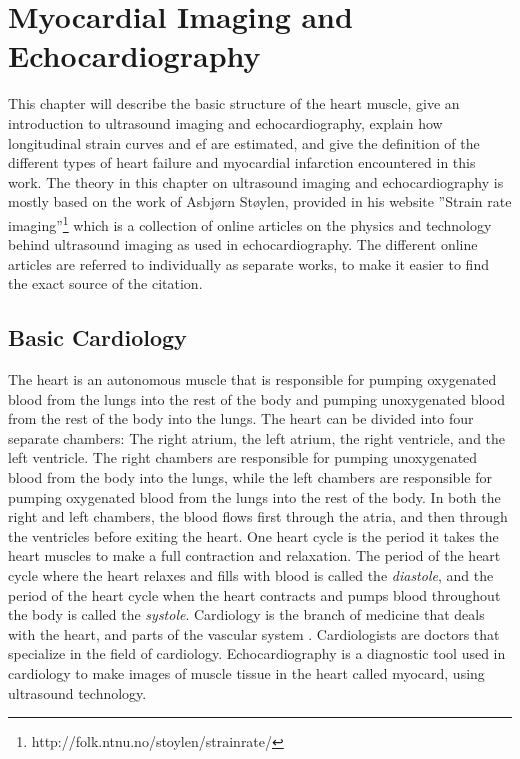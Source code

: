 \chapter{Myocardial Imaging and Echocardiography} \label{chap:strain}

This chapter will describe the basic structure of the heart muscle, give an introduction to ultrasound imaging and echocardiography, explain how longitudinal strain curves and \acrfull{ef} are estimated, and give the definition of the different types of heart failure and myocardial infarction encountered in this work. The theory in this chapter on ultrasound imaging and echocardiography is mostly based on the work of Asbjørn Støylen, provided in his website ''Strain rate imaging''\footnote{http://folk.ntnu.no/stoylen/strainrate/} which is a collection of online articles on the physics and technology behind ultrasound imaging as used in echocardiography. The different online articles are referred to individually as separate works, to make it easier to find the exact source of the citation.

\section{Basic Cardiology}

The heart is an autonomous muscle that is responsible for pumping oxygenated blood from the lungs into the rest of the body and pumping unoxygenated blood from the rest of the body into the lungs. The heart can be divided into four separate chambers: The right atrium, the left atrium, the right ventricle, and the left ventricle. The right chambers are responsible for pumping unoxygenated blood from the body into the lungs, while the left chambers are responsible for pumping oxygenated blood from the lungs into the rest of the body. In both the right and left chambers, the blood flows first through the atria, and then through the ventricles before exiting the heart. One heart cycle is the period it takes the heart muscles to make a full contraction and relaxation. The period of the heart cycle where the heart relaxes and fills with blood is called the \textit{diastole}, and the period of the heart cycle when the heart contracts and pumps blood throughout the body is called the \textit{systole}. Cardiology is the branch of medicine that deals with the heart, and parts of the vascular system \cite{cardiology_wikipedia}. Cardiologists are doctors that specialize in the field of cardiology. Echocardiography is a diagnostic tool used in cardiology to make images of muscle tissue in the heart called myocard, using ultrasound technology. 

